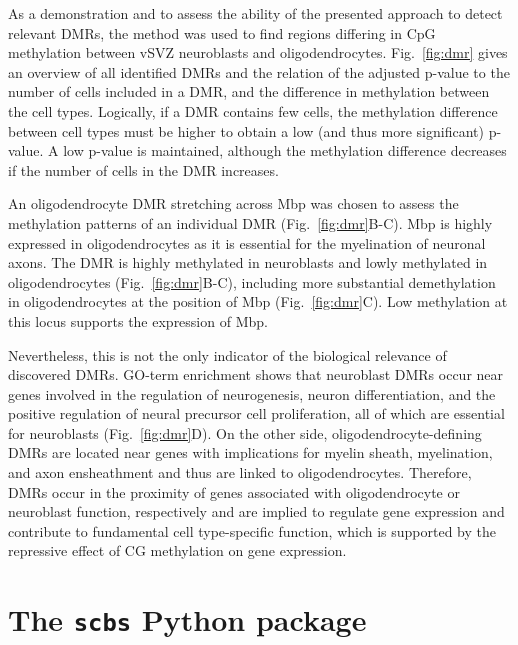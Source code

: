 \documentclass[twocolumn,10pt]{article}
\begin{document}
As a demonstration and to assess the ability of the presented approach to detect relevant DMRs, the method was used to find regions differing in CpG methylation between vSVZ neuroblasts and oligodendrocytes.
Fig.~\ref{fig:dmr} gives an overview of all identified DMRs and the relation of the adjusted p-value to the number of cells included in a DMR, and the difference in methylation between the cell types.
Logically, if a DMR contains few cells, the methylation difference between cell types must be higher to obtain a low (and thus more significant) p-value.
A low p-value is maintained, although the methylation difference decreases if the number of cells in the DMR increases.


An oligodendrocyte DMR stretching across Mbp was chosen to assess the methylation patterns of an individual DMR (Fig.~\ref{fig:dmr}B-C).
Mbp is highly expressed in oligodendrocytes as it is essential for the myelination of neuronal axons.
The DMR is highly methylated in neuroblasts and lowly methylated in oligodendrocytes (Fig.~\ref{fig:dmr}B-C), including more substantial demethylation in oligodendrocytes at the position of Mbp (Fig.~\ref{fig:dmr}C).
Low methylation at this locus supports the expression of Mbp.


Nevertheless, this is not the only indicator of the biological relevance of discovered DMRs.
GO-term enrichment shows that neuroblast DMRs occur near genes involved in the regulation of neurogenesis, neuron differentiation, and the positive regulation of neural precursor cell proliferation, all of which are essential for neuroblasts (Fig.~\ref{fig:dmr}D).
On the other side, oligodendrocyte-defining DMRs are located near genes with implications for myelin sheath, myelination, and axon ensheathment and thus are linked to oligodendrocytes.
Therefore, DMRs occur in the proximity of genes associated with oligodendrocyte or neuroblast function, respectively and are implied to regulate gene expression and contribute to fundamental cell type-specific function, which is supported by the repressive effect of CG methylation on gene expression.


\section{The \texttt{scbs} Python package}
\end{document}
